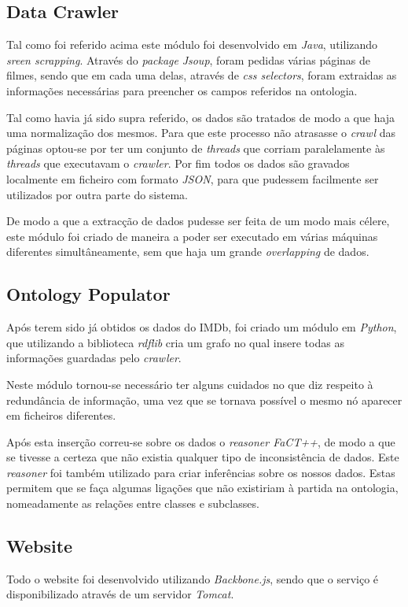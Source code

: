 \documentclass[a4paper]{article}
\begin{document}
\subsection{Data Crawler}
\indent \indent Tal como foi referido acima este módulo foi desenvolvido em \textit{Java}, utilizando \textit{sreen scrapping}. Através do \textit{package} \textit{Jsoup}, foram pedidas várias páginas de filmes, sendo que em cada uma delas, através de \textit{css selectors}, foram extraidas as informações necessárias para preencher os campos referidos na ontologia.

Tal como havia já sido supra referido, os dados são tratados de modo a que haja uma normalização dos mesmos. Para que este processo não atrasasse o \textit{crawl} das páginas optou-se por ter um conjunto de \textit{threads} que corriam paralelamente às \textit{threads} que executavam o \textit{crawler}. Por fim todos os dados são gravados localmente em ficheiro com formato \textit{JSON}, para que pudessem facilmente ser utilizados por outra parte do sistema.

De modo a que a extracção de dados pudesse ser feita de um modo mais célere, este módulo foi criado de maneira a poder ser executado em várias máquinas diferentes simultâneamente, sem que haja um grande \textit{overlapping} de dados.

\subsection{Ontology Populator}
\indent \indent Após terem sido já obtidos os dados do IMDb, foi criado um módulo em \textit{Python}, que utilizando a biblioteca \textit{rdflib} cria um grafo no qual insere todas as informações guardadas pelo \textit{crawler}.

Neste módulo tornou-se necessário ter alguns cuidados no que diz respeito à redundância de informação, uma vez que se tornava possível o mesmo nó aparecer em ficheiros diferentes.

Após esta inserção correu-se sobre os dados o \textit{reasoner FaCT++}, de modo a que se tivesse a certeza que não existia qualquer tipo de inconsistência de dados. Este \textit{reasoner} foi também utilizado para criar inferências sobre os nossos dados. Estas permitem que se faça algumas ligações que não existiriam à partida na ontologia, nomeadamente as relações entre classes e subclasses.

\subsection{Website}
\indent \indent Todo o website foi desenvolvido utilizando \textit{Backbone.js}, sendo que o serviço é disponibilizado através de um servidor \textit{Tomcat}.
\end{document}
